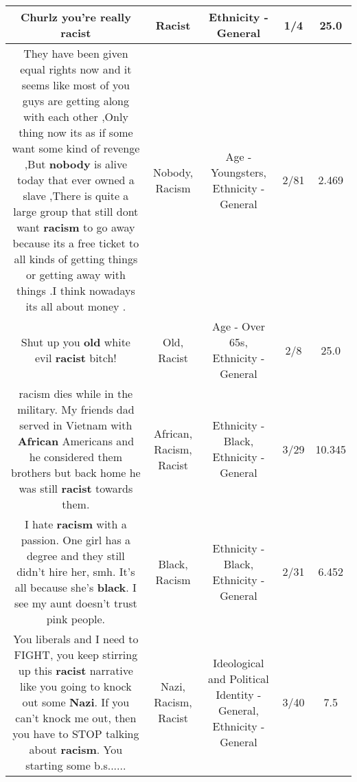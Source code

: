 \documentclass[11pt]{article}
\newlength\mylength
\begin{document}
\begin{center}
\begin{longtable}{|C{.65\mylength}|C{.30\mylength}|C{.12\mylength}|C{.12\mylength}|C{.12\mylength}|}
  \small Churlz you're really racist\normalsize   & Racist & Ethnicity - General & 1/4 & 25.0 \\  \hline
  \small They have been given equal rights now and it seems like most of you guys are getting along with each other ,Only thing now its as if some want some kind of revenge ,But \textbf{nobody} is alive today that ever owned a slave ,There is quite a large group that still dont want \textbf{racism} to go away because its a free ticket to all kinds of getting things or getting away with things .I think nowadays its all about money .\normalsize   & Nobody, Racism & Age - Youngsters, Ethnicity - General & 2/81 & 2.469 \\  \hline
  \small Shut up you \textbf{old} white evil \textbf{racist} bitch!\normalsize   & Old, Racist & Age - Over 65s, Ethnicity - General & 2/8 & 25.0 \\  \hline
  \small racism dies while in the military. My friends dad served in Vietnam with \textbf{African} Americans and he considered them brothers but back home he was still \textbf{racist} towards them.\normalsize   & African, Racism, Racist & Ethnicity - Black, Ethnicity - General & 3/29 & 10.345 \\  \hline
  \small I hate \textbf{racism} with a passion. One girl has a degree and they still didn't hire her, smh. It's all because she's \textbf{black}. I see my aunt doesn't trust pink people.\normalsize   & Black, Racism & Ethnicity - Black, Ethnicity - General & 2/31 & 6.452 \\  \hline
  \small You liberals and I need to FIGHT, you keep stirring up this \textbf{racist} narrative like you going to knock out some \textbf{Nazi}. If you can't knock me out, then you have to STOP talking about \textbf{racism}. You starting some b.s......\normalsize   & Nazi, Racism, Racist &  Ideological and Political Identity - General, Ethnicity - General & 3/40 & 7.5 \\  \hline

\end{longtable}
\end{center}
\end{document}
